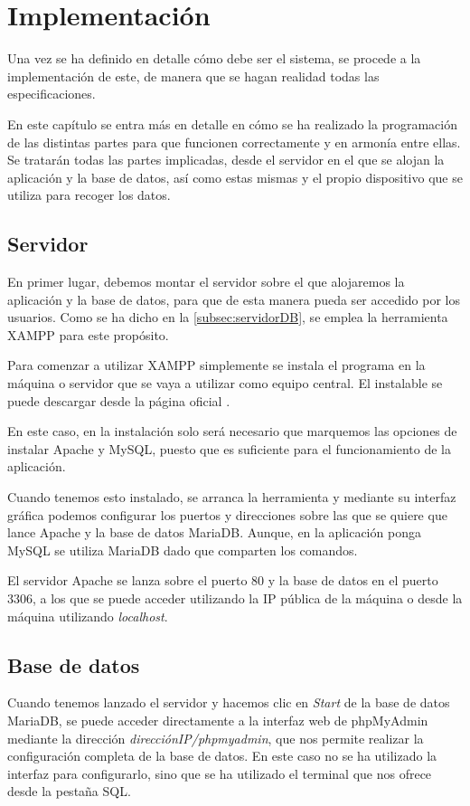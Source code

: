 \chapter{Implementación}
\label{ch:implementacion}
Una vez se ha definido en detalle cómo debe ser el sistema, se procede a la implementación de este, de manera que se hagan realidad todas las especificaciones. 

En este capítulo se entra más en detalle en cómo se ha realizado la programación de las distintas partes para que funcionen correctamente y en armonía entre ellas. Se tratarán todas las partes implicadas, desde el servidor en el que se alojan la aplicación y la base de datos, así como estas mismas y el propio dispositivo que se utiliza para recoger los datos.

\section{Servidor}
En primer lugar, debemos montar el servidor sobre el que alojaremos la aplicación y la base de datos, para que de esta manera pueda ser accedido por los usuarios. Como se ha dicho en la \autoref{subsec:servidorDB}, se emplea la herramienta XAMPP para este propósito.

Para comenzar a utilizar XAMPP simplemente se instala el programa en la máquina o servidor que se vaya a utilizar como equipo central. El instalable se puede descargar desde la página oficial \cite{noauthor_xampp_nodate}.

En este caso, en la instalación solo será necesario que marquemos las opciones de instalar Apache y MySQL, puesto que es suficiente para el funcionamiento de la aplicación.

Cuando tenemos esto instalado, se arranca la herramienta y mediante su interfaz gráfica podemos configurar los puertos y direcciones sobre las que se quiere que lance Apache y la base de datos MariaDB. Aunque, en la aplicación ponga MySQL se utiliza MariaDB dado que comparten los comandos.

El servidor Apache se lanza sobre el puerto 80 y la base de datos en el puerto 3306, a los que se puede acceder utilizando la IP pública de la máquina o desde la máquina utilizando \textit{localhost}.

\section{Base de datos}
Cuando tenemos lanzado el servidor y hacemos clic en \textit{Start} de la base de datos MariaDB, se puede acceder directamente a la interfaz web de phpMyAdmin mediante la dirección \textit{direcciónIP/phpmyadmin}, que nos permite realizar la configuración completa de la base de datos. En este caso no se ha utilizado la interfaz para configurarlo, sino que se ha utilizado el terminal que nos ofrece desde la pestaña SQL. 
\pagebreak

